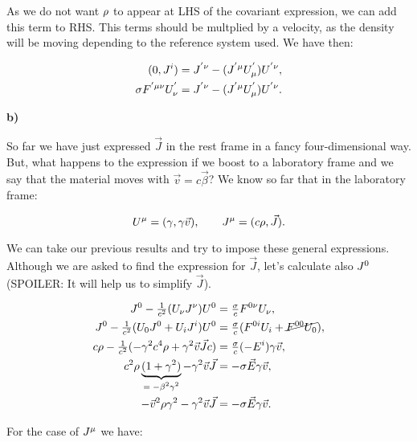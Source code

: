 As we do not want $\rho$ to appear at LHS of the covariant expression, we can add this term to RHS. This terms should be multplied by a velocity, as the density will be moving depending to the reference system used. We have then:

\begin{equation}
	\begin{split}
		(0,J^{i }) &= J^{'\nu } - (J^{'\mu } U_{\mu }^{'})U^{'\nu },\\
		\sigma F^{'\mu\nu } U_{\nu }^{'} &= J^{'\nu } - (J^{'\mu } U_{\mu }^{'})U^{'\nu }.
	\end{split}
\end{equation}

\textbf{b)}

So far we have just expressed $\vec{J}$ in the rest frame in a fancy four-dimensional way. But, what happens to the expression if we boost to a laboratory frame and we say that the material moves with $\vec{v}= c \vec{\beta}$? We know so far that in the laboratory frame:

\begin{equation}
	U^{\mu } = (\gamma, \gamma \vec{v}), \quad \quad J^{\mu } = (c \rho, \vec{J}).
\end{equation}

We can take our previous results and try to impose these general expressions. Although we are asked to find the expression for $\vec{J}$, let's calculate also $J^{0 }$ (SPOILER: It will help us to simplify $\vec{J}$).


\begin{equation}\label{mu0}
	\begin{split}
		J^{0} - \tfrac{1}{c^{2}} (U_{\nu }J^{\nu })U^{0 } &= \tfrac{\sigma}{c} F^{0\nu }U_{\nu },\\
		J^{0} - \tfrac{1}{c^{2}} (U_{0 }J^{0 } + U_{i }J^{i })U^{0 }&=  \tfrac{\sigma}{c} (F^{0i }U_{i } + \cancel{F^{00 }U_{0 }}),\\
		c\rho - \tfrac{1}{c^{2}} (- \gamma^{2} c^{4} \rho + \gamma^{2}\vec{v}\vec{J} c) &=  \tfrac{\sigma}{c} (-E^{i})\gamma \vec{v},\\
		c^{2} \rho \underbrace{(1 + \gamma^{2})}_{\text{$= -\beta^{2} \gamma^{2}$}} - \gamma^{2} \vec{v}\vec{J} &= -\sigma \vec{E} \gamma \vec{v},\\
		-\vec{v}^{2} \rho \gamma^{2} - \gamma^{2} \vec{v}\vec{J} &=-\sigma \vec{E}\gamma \vec{v}.
	\end{split}
\end{equation}

For the case of $J^{\mu }$ we have:

